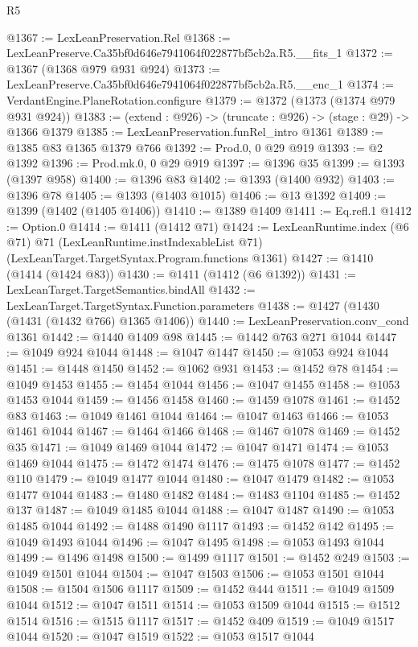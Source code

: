 \begin{lexlean}{R5}
\begin{coremodule}
@1367 := LexLeanPreservation.Rel
@1368 := LexLeanPreserve.Ca35bf0d646e7941064f022877bf5cb2a.R5.__fits_1
@1372 := @1367 (@1368 @979 @931 @924)
@1373 := LexLeanPreserve.Ca35bf0d646e7941064f022877bf5cb2a.R5.__enc_1
@1374 := VerdantEngine.PlaneRotation.configure
@1379 := @1372 (@1373 (@1374 @979 @931 @924))
@1383 := (extend : @926) -> (truncate : @926) -> (stage : @29) -> @1366 @1379
@1385 := LexLeanPreservation.funRel_intro @1361
@1389 := @1385 @83 @1365 @1379 @766
@1392 := Prod.{0, 0} @29 @919
@1393 := @2 @1392
@1396 := Prod.mk.{0, 0} @29 @919
@1397 := @1396 @35
@1399 := @1393 (@1397 @958)
@1400 := @1396 @83
@1402 := @1393 (@1400 @932)
@1403 := @1396 @78
@1405 := @1393 (@1403 @1015)
@1406 := @13 @1392
@1409 := @1399 (@1402 (@1405 @1406))
@1410 := @1389 @1409
@1411 := Eq.refl.{1}
@1412 := Option.{0}
@1414 := @1411 (@1412 @71)
@1424 := LexLeanRuntime.index
    (@6 @71)
    @71
    (LexLeanRuntime.instIndexableList @71)
    (LexLeanTarget.TargetSyntax.Program.functions @1361)
@1427 := @1410 (@1414 (@1424 @83))
@1430 := @1411 (@1412 (@6 @1392))
@1431 := LexLeanTarget.TargetSemantics.bindAll
@1432 := LexLeanTarget.TargetSyntax.Function.parameters
@1438 := @1427 (@1430 (@1431 (@1432 @766) @1365 @1406))
@1440 := LexLeanPreservation.conv_cond @1361
@1442 := @1440 @1409 @98
@1445 := @1442 @763 @271 @1044
@1447 := @1049 @924 @1044
@1448 := @1047 @1447
@1450 := @1053 @924 @1044
@1451 := @1448 @1450
@1452 := @1062 @931
@1453 := @1452 @78
@1454 := @1049 @1453
@1455 := @1454 @1044
@1456 := @1047 @1455
@1458 := @1053 @1453 @1044
@1459 := @1456 @1458
@1460 := @1459 @1078
@1461 := @1452 @83
@1463 := @1049 @1461 @1044
@1464 := @1047 @1463
@1466 := @1053 @1461 @1044
@1467 := @1464 @1466
@1468 := @1467 @1078
@1469 := @1452 @35
@1471 := @1049 @1469 @1044
@1472 := @1047 @1471
@1474 := @1053 @1469 @1044
@1475 := @1472 @1474
@1476 := @1475 @1078
@1477 := @1452 @110
@1479 := @1049 @1477 @1044
@1480 := @1047 @1479
@1482 := @1053 @1477 @1044
@1483 := @1480 @1482
@1484 := @1483 @1104
@1485 := @1452 @137
@1487 := @1049 @1485 @1044
@1488 := @1047 @1487
@1490 := @1053 @1485 @1044
@1492 := @1488 @1490 @1117
@1493 := @1452 @142
@1495 := @1049 @1493 @1044
@1496 := @1047 @1495
@1498 := @1053 @1493 @1044
@1499 := @1496 @1498
@1500 := @1499 @1117
@1501 := @1452 @249
@1503 := @1049 @1501 @1044
@1504 := @1047 @1503
@1506 := @1053 @1501 @1044
@1508 := @1504 @1506 @1117
@1509 := @1452 @444
@1511 := @1049 @1509 @1044
@1512 := @1047 @1511
@1514 := @1053 @1509 @1044
@1515 := @1512 @1514
@1516 := @1515 @1117
@1517 := @1452 @409
@1519 := @1049 @1517 @1044
@1520 := @1047 @1519
@1522 := @1053 @1517 @1044

\end{coremodule}
\end{lexlean}
